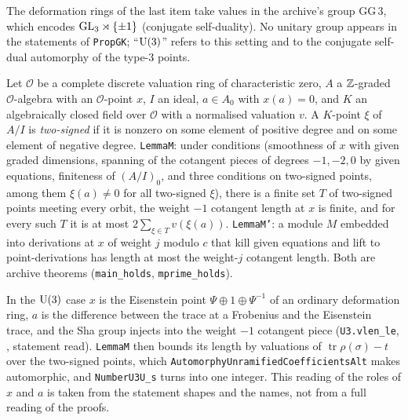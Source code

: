 
\begin{remark}\label{sha:rem-u3}
The deformation rings of the last item take values in the archive's group
$\mathrm{GG}\,3$, which encodes $\mathrm{GL}_3\rtimes\{\pm1\}$ (conjugate self-duality). No unitary
group appears in the statements of \texttt{PropGK}; ``$\mathrm{U}(3)$'' refers to this setting and to
the conjugate self-dual automorphy of the type-3 points.
\end{remark}

\begin{definition}\label{sha:lemmam}
Let $\mathcal O$ be a complete discrete valuation ring of characteristic zero, $A$ a
$\mathbb{Z}$-graded $\mathcal O$-algebra with an $\mathcal O$-point $x$, $I$ an ideal, $a\in A_0$ with
$x(a)=0$, and $K$ an algebraically closed field over $\mathcal O$ with a normalised valuation
$v$. A $K$-point $\xi$ of $A/I$ is \emph{two-signed} if it is nonzero on some element of
positive degree and on some element of negative degree. \texttt{LemmaM}: under conditions
(smoothness of $x$ with given graded dimensions, spanning of the cotangent pieces of degrees
$-1,-2,0$ by given equations, finiteness of $(A/I)_0$, and three conditions on two-signed
points, among them $\xi(a)\ne0$ for all two-signed $\xi$), there is a finite set $T$ of
two-signed points meeting every orbit, the weight $-1$ cotangent length at $x$ is finite, and
for every such $T$ it is at most $2\sum_{\xi\in T}v(\xi(a))$. \texttt{LemmaM'}: a module $M$
embedded into derivations at $x$ of weight $j$ modulo $c$ that kill given equations and lift
to point-derivations has length at most the weight-$j$ cotangent length. Both are archive
theorems (\texttt{main\_holds}, \texttt{mprime\_holds}).
\end{definition}

\begin{remark}\label{sha:rem-mech}
In the $\mathrm{U}(3)$ case $x$ is the Eisenstein point $\Psi\oplus1\oplus\Psi^{-1}$ of an ordinary
deformation ring, $a$ is the difference between the trace at a Frobenius and the Eisenstein
trace, and the Sha group injects into the weight $-1$ cotangent piece (\texttt{U3.vlen\_le},
,
statement read). \texttt{LemmaM} then bounds its length by valuations of
$\operatorname{tr}\rho(\sigma)-t$ over the two-signed points, which
\texttt{AutomorphyUnramifiedCoefficientsAlt} makes automorphic, and \texttt{NumberU3U\_s}
turns into one integer. This reading of the roles of $x$ and $a$ is taken from the statement
shapes and the names, not from a full reading of the proofs.
\end{remark}

